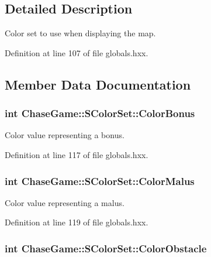 \subsection{Detailed Description}
Color set to use when displaying the map. 

Definition at line 107 of file globals.\-hxx.



\subsection{Member Data Documentation}
\hypertarget{struct_chase_game_1_1_s_color_set_aacd34496b36640358ecae127f6bb6cc4}{
\subsubsection[{Color\-Bonus}]{\setlength{\rightskip}{0pt plus 5cm}int Chase\-Game\-::\-S\-Color\-Set\-::\-Color\-Bonus}}\label{struct_chase_game_1_1_s_color_set_aacd34496b36640358ecae127f6bb6cc4}


Color value representing a bonus. 



Definition at line 117 of file globals.\-hxx.

\hypertarget{struct_chase_game_1_1_s_color_set_aa2eb52b7d1fb4059da9935a230715498}{
\subsubsection[{Color\-Malus}]{\setlength{\rightskip}{0pt plus 5cm}int Chase\-Game\-::\-S\-Color\-Set\-::\-Color\-Malus}}\label{struct_chase_game_1_1_s_color_set_aa2eb52b7d1fb4059da9935a230715498}


Color value representing a malus. 



Definition at line 119 of file globals.\-hxx.

\hypertarget{struct_chase_game_1_1_s_color_set_acb1e4df5c042ae8ca8a66d7de26a9148}{
\subsubsection[{Color\-Obstacle}]{\setlength{\rightskip}{0pt plus 5cm}int Chase\-Game\-::\-S\-Color\-Set\-::\-Color\-Obstacle}}\label{struct_chase_game_1_1_s_color_set_acb1e4df5c042ae8ca8a66d7de26a9148}


